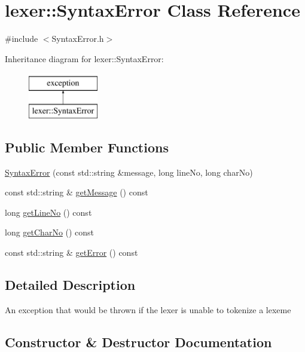 \hypertarget{classlexer_1_1SyntaxError}{}\section{lexer\+:\+:Syntax\+Error Class Reference}
\label{classlexer_1_1SyntaxError}


{\ttfamily \#include $<$Syntax\+Error.\+h$>$}

Inheritance diagram for lexer\+:\+:Syntax\+Error\+:\begin{figure}[H]
\begin{center}
\leavevmode
\includegraphics[height=2.000000cm]{da/d76/classlexer_1_1SyntaxError}
\end{center}
\end{figure}
\subsection*{Public Member Functions}
\begin{DoxyCompactItemize}
\item 
\hyperlink{classlexer_1_1SyntaxError_a262bacfa0626d21950351b0a80889478}{Syntax\+Error} (const std\+::string \&message, long line\+No, long char\+No)
\item 
const std\+::string \& \hyperlink{classlexer_1_1SyntaxError_a3d74d0fc324be531970cc46a3af508ba}{get\+Message} () const
\item 
long \hyperlink{classlexer_1_1SyntaxError_acb66cecfd69b518b0397df99ed614075}{get\+Line\+No} () const
\item 
long \hyperlink{classlexer_1_1SyntaxError_ac56edd0a70d044bccc02c734f62ff629}{get\+Char\+No} () const
\item 
const std\+::string \& \hyperlink{classlexer_1_1SyntaxError_ab240699fbd189206d810fb939e9a5a84}{get\+Error} () const
\end{DoxyCompactItemize}


\subsection{Detailed Description}
An exception that would be thrown if the lexer is unable to tokenize a lexeme 

\subsection{Constructor \& Destructor Documentation}
\mbox{\label{classlexer_1_1SyntaxError_a262bacfa0626d21950351b0a80889478}} 
